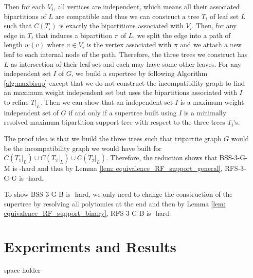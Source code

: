 \documentclass[twocolumn]{bmcart}%
\newcommand{\bssthree}{\textsc{BSS-$3$}\xspace}
\newcommand{\rfthree}{\textsc{RFS-$3$}\xspace}
\newcommand{\B}{\textsc{B}\xspace}
\renewcommand{\G}{\textsc{G}\xspace}
\renewcommand{\M}{\textsc{M}\xspace}
\theoremstyle{mystyle}
\theoremstyle{proofstyle}
\begin{document}
Then for each $V_i$, all vertices are independent, which means all their associated bipartitions of $L$ are compatible and thus we can construct a tree $T_i$ of leaf set $L$ such that $C(T_i)$ is exactly the bipartitions associated with $V_i$. Then, for any edge in $T_i$ that induces a bipartition $\pi$ of $L$, we split the edge into a path of length $w(v)$ where $v \in V_i$ is the vertex associated with $\pi$ and we attach a new leaf to each internal node of the path. Therefore, the three trees we construct has $L$ as intersection of their leaf set and each may have some other leaves. For any independent set $I$ of $G$, we build a supertree by following Algorithm \ref{alg:maxbisup} except that we do not construct the incompatibility graph to find an maximum weight independent set but uses the bipartitions associated with $I$ to refine $T|_L$. Then we can show that an independent set $I$ is a maximum weight independent set of $G$ if and only if a supertree built using $I$ is a minimally resolved maximum bipartition support tree with respect to the three trees $T_i$'s. 

The proof idea is that we build the three trees such that tripartite graph $G$ would be the incompatibility graph we would have built for $C(T_1|_L) \cup C(T_2|_L) \cup C(T_2|_L)$. Therefore, the reduction shows that \bssthree-\G-\M is \NP-hard and thus by Lemma \ref{lem: equivalence_RF_support_general}, \rfthree-\G-\G is \NP-hard.

To show \bssthree-\G-\B is \NP-hard, we only need to change the construction of the supertree by resolving all polytomies at the end and then by Lemma \ref{lem: equivalence_RF_support_binary}, \rfthree-\G-\B is \NP-hard.

\section{Experiments and Results}
\newpage
space holder
\newpage




\end{document}
